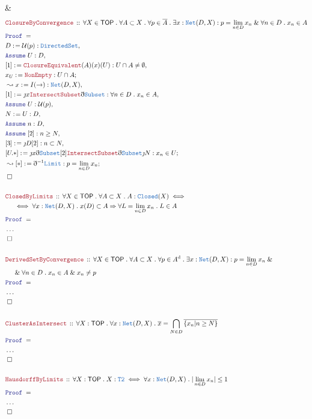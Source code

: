 \documentclass[12pt]{scrartcl}
\newcommand{\TYPE}[1]{\textcolor{NavyBlue}{\mathtt{#1}}}
\newcommand{\LOGIC}[1]{\textcolor{Blue}{\mathtt{#1}}}
\newcommand{\THM}[1]{\textcolor{Maroon}{\mathtt{#1}}}
\renewcommand{\.}{\; . \;}
\newcommand{\de}{: \kern 0.1pc =}
\newcommand{\Theorem}[2]{& \THM{#1} \, :: \, #2 \\ & \Proof = \\ }
\newcommand{\NewLine}{\\ & \kern 1pc}
\newcommand{\Page}[1]{ \begin{align*} #1 \end{align*}   }
\newcommand{ \bd }{ \ByDef }
\newcommand{\NoProof}{ & \ldots \\ \EndProof}
\renewcommand{\And}{\; \& \;}
\newcommand{\Imply}{\Rightarrow}
\newcommand{\Say}[3]{& #1 \de #2 : #3, \\}
\newcommand{\Conclude}[3]{& #1 \de #2 : #3; \\}
\newcommand{\Derive}[3]{& \leadsto #1 \de #2 : #3, \\}
\newcommand{\DeriveConclude}[3]{& \leadsto #1 \de #2 : #3 ; \\}
\newcommand{\Assume}[2]{& \LOGIC{Assume} \; #1 : #2, \\}
\newcommand{\QED}{\; \square}
\newcommand{\EndProof}{& \QED \\}
\newcommand{\ByDef}{\eth}
\newcommand{\ByConstr}{\jmath}
\newcommand{\Proof}{\LOGIC{Proof} \; }
\newcommand{\TOP}{\mathsf{TOP}}
\newcommand{\U}{\mathcal{U}}
\renewcommand{\d}{\mathrm{d}}
\begin{document}
{{	}
	\EndProof
}\Page{
	\Theorem{ClosureByConvergence}
	{
		\forall X \in \TOP \.
		\forall A \subset X \.
		\forall p \in \overline{A} \.
		\exists x : \TYPE{Net}(D,X) :
		p = \lim_{n \in D} x_n \And \forall n \in D \. x_n \in A
	}
	\Say{D}{\U(p)}{\TYPE{DirectedSet}}
	\Assume{U}{D}
	\Say{[1]}{\THM{ClosureEquivalent}(A)(x)(U)}{ U \cap A \neq \emptyset}
	\Conclude{x_U}{\THM{NonEmpty}}{ U \cap A  }
	\Derive{x}{I(\to)}{\TYPE{Net}(D,X)}
	\Say{[1]}{\ByConstr x \THM{IntersectSubset} \bd \TYPE{Subset}}{ \forall n \in D \. x_n \in A  }
	\Assume{U}{\U(p)}
	\Say{N}{U}{D}
	\Assume{n}{D}
	\Assume{[2]}{n \ge N}
	\Say{[3]}{\ByConstr D[2]}{n \subset N}
	\Conclude{[U.*]}{\ByConstr x \bd \TYPE{Subset} [2] \THM{IntersectSubset} \bd \TYPE{Subset}\ByConstr N}
	{
		x_n \in U                                 
	}
	\DeriveConclude{[*]}{\bd^{-1} \TYPE{Limit}}{p = \lim_{n \in D} x_n }
	\EndProof
	\\
	\Theorem{ClosedByLimits}
	{
		\forall X \in \TOP \.
		\forall A \subset X \.
		A : \TYPE{Closed}(X) 
		\iff \NewLine \iff
		\forall x : \TYPE{Net}(D,X) \. x(D) \subset A \Imply  \forall L = \lim_{n \in D} x_n \. L \in A
	}
	\NoProof
	\\
	\Theorem{DerivedSetByConvergence}
	{
		\forall X \in \TOP \.
		\forall A \subset X \.
		\forall p \in A^\d \.
		\exists x : \TYPE{Net}(D,X) :
		p = \lim_{n \in D} x_n \And 
		\NewLine \And
		\forall n \in D \. x_n \in A \And x_n \neq p
	}
	\NoProof
	\\
	\Theorem{ClusterAsIntersect}
	{
		\forall X : \TOP \.
		\forall x : \TYPE{Net}(D,X) \. 
		\overline{x} = \bigcap_{N \in D} \overline{\{ x_n | n \ge N \}}
	}
	\NoProof
	\\
	\Theorem{HausdorffByLimits}
	{
		\forall X : \TOP \.
		X : \TYPE{T2} \iff \forall x : \TYPE{Net}(D,X) \. |\lim_{n \in D} x_n| \le 1
	}
	\NoProof
}
\newpage
\end{document}
